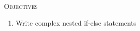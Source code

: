 \textsc{Objectives}
 \begin{enumerate}
   \item Write complex nested if-else statements
 \end{enumerate}
\mbox{}\\
